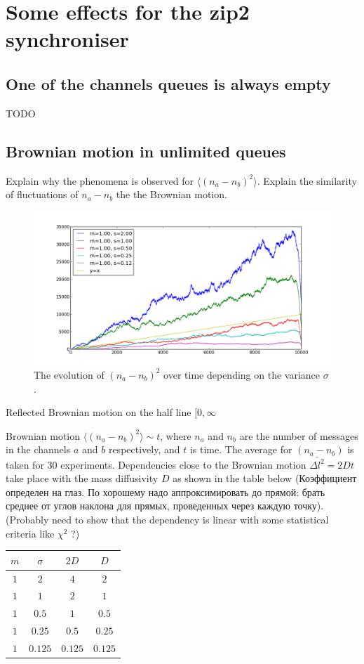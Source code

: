 \chapter{Some effects for the zip2 synchroniser}
  \section{One of the channels queues is always empty}
TODO

  \section{Brownian motion in unlimited queues}
Explain why the phenomena is observed for $\langle (n_{a} - n_{b})^{2} \rangle$. Explain the similarity of fluctuations of $n_{a} - n_{b}$ the the Brownian motion.
  \begin{figure}[h!]
  \centering
  \includegraphics[scale=0.4]{figs/all.png}
  \caption{The evolution of $(n_{a} - n_{b})^{2}$ over time depending on the variance $\sigma$.}
  \label{fig:brownian}
  \end{figure}

Reflected Brownian motion on the half line $[0,\infty$

Brownian motion $\langle (n_{a} - n_{b})^{2} \rangle \sim t$, where $n_{a}$ and $n_{b}$ are the number of messages in the channels $a$ and $b$ respectively, and $t$ is time. The average for $(n_{a} - n_{b})$ is taken for 30 experiments. Dependencies close to the Brownian motion $\bar{\Delta l^2} = 2Dt$ take place with the mass diffusivity $D$ as shown in the table below (Коэффициент определен на глаз. По хорошему надо аппроксимировать до прямой: брать среднее от углов наклона для прямых, проведенных через каждую точку). (Probably need to show that the dependency is linear with some statistical criteria like $\chi^{2}$ ?)
  \begin{tabular}{c|c|c|c}
  $m$ & $\sigma$ & $2D$ & $D$\\
  \hline
  $1$ & $2$ & $4$ & $2$\\
  \hline
  $1$ & $1$ & $2$ & $1$\\
  \hline
  $1$ & $0.5$ & $1$ & $0.5$\\
  \hline
  $1$ & $0.25$ & $0.5$ & $0.25$\\
  \hline
  $1$ & $0.125$ & $0.125$ & $0.125$\\ 
  \end{tabular}

